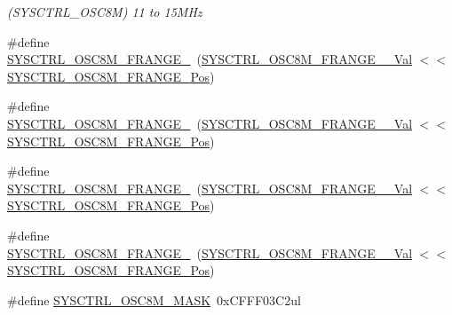 \begin{DoxyCompactItemize}
\begin{DoxyCompactList}\small\item\em (S\+Y\+S\+C\+T\+R\+L\+\_\+\+O\+S\+C8M) 11 to 15M\+Hz \end{DoxyCompactList}\item 
\#define \mbox{\hyperlink{group___s_a_m_d21___s_y_s_c_t_r_l_ga8928355969b7ddae612709e887eb049c}{S\+Y\+S\+C\+T\+R\+L\+\_\+\+O\+S\+C8\+M\+\_\+\+F\+R\+A\+N\+G\+E\+\_}}~(\mbox{\hyperlink{group___s_a_m_d21___s_y_s_c_t_r_l_ga08f30f18cc32f3878dd2d88778f251d7}{S\+Y\+S\+C\+T\+R\+L\+\_\+\+O\+S\+C8\+M\+\_\+\+F\+R\+A\+N\+G\+E\+\_\+\_\+\+Val}}    $<$$<$ \mbox{\hyperlink{group___s_a_m_d21___s_y_s_c_t_r_l_ga29d2774a43cd9d3b53fde14cf70b27f6}{S\+Y\+S\+C\+T\+R\+L\+\_\+\+O\+S\+C8\+M\+\_\+\+F\+R\+A\+N\+G\+E\+\_\+\+Pos}})
\item 
\#define \mbox{\hyperlink{group___s_a_m_d21___s_y_s_c_t_r_l_ga237b3203241cd6981cf1e9a8fca7637a}{S\+Y\+S\+C\+T\+R\+L\+\_\+\+O\+S\+C8\+M\+\_\+\+F\+R\+A\+N\+G\+E\+\_}}~(\mbox{\hyperlink{group___s_a_m_d21___s_y_s_c_t_r_l_ga90cd336bca0a2b659b2381bdffe38d5e}{S\+Y\+S\+C\+T\+R\+L\+\_\+\+O\+S\+C8\+M\+\_\+\+F\+R\+A\+N\+G\+E\+\_\+\_\+\+Val}}    $<$$<$ \mbox{\hyperlink{group___s_a_m_d21___s_y_s_c_t_r_l_ga29d2774a43cd9d3b53fde14cf70b27f6}{S\+Y\+S\+C\+T\+R\+L\+\_\+\+O\+S\+C8\+M\+\_\+\+F\+R\+A\+N\+G\+E\+\_\+\+Pos}})
\item 
\#define \mbox{\hyperlink{group___s_a_m_d21___s_y_s_c_t_r_l_gae62528003765ddd11c7622e8a8fc380e}{S\+Y\+S\+C\+T\+R\+L\+\_\+\+O\+S\+C8\+M\+\_\+\+F\+R\+A\+N\+G\+E\+\_}}~(\mbox{\hyperlink{group___s_a_m_d21___s_y_s_c_t_r_l_gaf03d2cb29a63878c283bab0b3815d3ad}{S\+Y\+S\+C\+T\+R\+L\+\_\+\+O\+S\+C8\+M\+\_\+\+F\+R\+A\+N\+G\+E\+\_\+\_\+\+Val}}    $<$$<$ \mbox{\hyperlink{group___s_a_m_d21___s_y_s_c_t_r_l_ga29d2774a43cd9d3b53fde14cf70b27f6}{S\+Y\+S\+C\+T\+R\+L\+\_\+\+O\+S\+C8\+M\+\_\+\+F\+R\+A\+N\+G\+E\+\_\+\+Pos}})
\item 
\#define \mbox{\hyperlink{group___s_a_m_d21___s_y_s_c_t_r_l_gadc4c917eb68b5b59b1162c3bbc94dad0}{S\+Y\+S\+C\+T\+R\+L\+\_\+\+O\+S\+C8\+M\+\_\+\+F\+R\+A\+N\+G\+E\+\_}}~(\mbox{\hyperlink{group___s_a_m_d21___s_y_s_c_t_r_l_ga359e0a7fa70deeef922cdfae0a782447}{S\+Y\+S\+C\+T\+R\+L\+\_\+\+O\+S\+C8\+M\+\_\+\+F\+R\+A\+N\+G\+E\+\_\+\_\+\+Val}}    $<$$<$ \mbox{\hyperlink{group___s_a_m_d21___s_y_s_c_t_r_l_ga29d2774a43cd9d3b53fde14cf70b27f6}{S\+Y\+S\+C\+T\+R\+L\+\_\+\+O\+S\+C8\+M\+\_\+\+F\+R\+A\+N\+G\+E\+\_\+\+Pos}})
\item 
\#define \mbox{\hyperlink{group___s_a_m_d21___s_y_s_c_t_r_l_ga8414336dcab7285f57b8eeced245cc74}{S\+Y\+S\+C\+T\+R\+L\+\_\+\+O\+S\+C8\+M\+\_\+\+M\+A\+SK}}~0x\+C\+F\+F\+F03\+C2ul

\end{DoxyCompactItemize}
